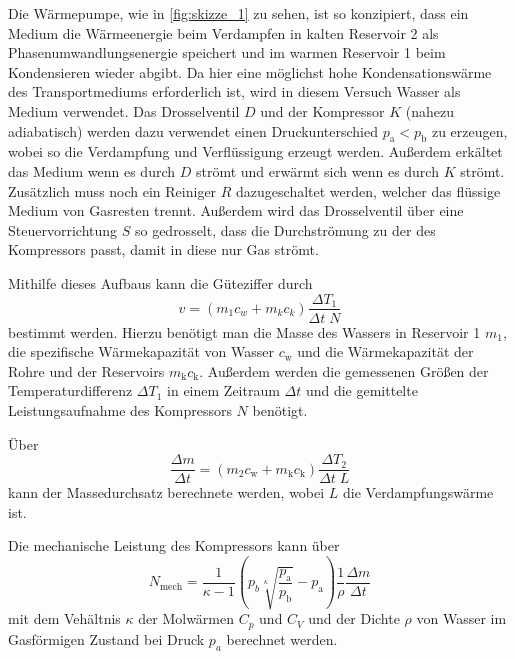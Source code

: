 Die Wärmepumpe, wie in \autoref{fig:skizze_1} zu sehen, ist so konzipiert, dass ein Medium die Wärmeenergie beim Verdampfen in kalten Reservoir 2 als Phasenumwandlungsenergie speichert und im warmen Reservoir 1 beim Kondensieren wieder abgibt.
Da hier eine möglichst hohe Kondensationswärme des Transportmediums erforderlich ist, wird in diesem Versuch Wasser als Medium verwendet.
Das Drosselventil $D$ und der Kompressor $K$ (nahezu adiabatisch) werden dazu verwendet einen Druckunterschied $p_\text{a} < p_\text{b}$ zu erzeugen, wobei so die Verdampfung und Verflüssigung erzeugt werden.
Außerdem erkältet das Medium wenn es durch $D$ strömt und erwärmt sich wenn es durch $K$ strömt.
Zusätzlich muss noch ein Reiniger $R$ dazugeschaltet werden, welcher das flüssige Medium von Gasresten trennt. 
Außerdem wird das Drosselventil über eine Steuervorrichtung $S$ so gedrosselt, dass die Durchströmung zu der des Kompressors passt, damit in diese nur Gas strömt.

Mithilfe dieses Aufbaus kann die Güteziffer durch
\begin{equation}
    v = (m_1 c_w + m_k c_k) \frac{\Delta T_1}{\Delta t \; N}
    \label{eq:gueteziffer_2}
\end{equation}
bestimmt werden. 
Hierzu benötigt man die Masse des Wassers in Reservoir 1 $m_1$, die spezifische Wärmekapazität von Wasser $c_\text{w}$ und die Wärmekapazität der Rohre und der Reservoirs $m_\text{k} c_\text{k}$.
Außerdem werden die gemessenen Größen der Temperaturdifferenz $\Delta T_1$ in einem Zeitraum $\Delta t$ und die gemittelte Leistungsaufnahme des Kompressors $N$ benötigt.\cite{V206}

Über
\begin{equation}
    \frac{\Delta m}{\Delta t} = (m_2 c_\text{w} + m_\text{k} c_\text{k}) \frac{\Delta T_2}{\Delta t \; L}
    \label{eq:massen}
\end{equation}
kann der Massedurchsatz berechnete werden, wobei $L$ die Verdampfungswärme ist.

Die mechanische Leistung des Kompressors kann über
\begin{equation}
    N_\text{mech} = \frac{1}{\kappa - 1} \left( p_b \sqrt[\kappa]{\frac{p_\text{a}}{p_\text{b}}} - p_\text{a} \right) \frac{1}{\rho} \frac{\Delta m}{\Delta t}
    \label{eq:arbeit}
\end{equation}
mit dem Vehältnis $\kappa$ der Molwärmen $C_p$ und $C_V$ und der Dichte $\rho$ von Wasser im Gasförmigen Zustand bei Druck $p_a$ berechnet werden.\cite{V206}
